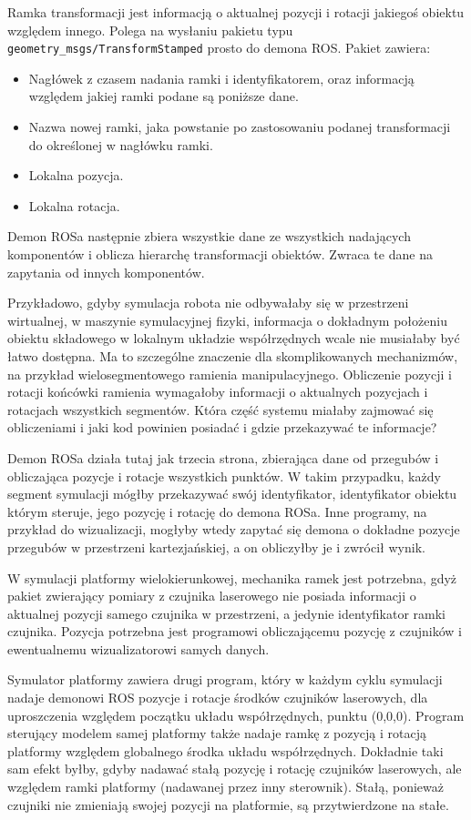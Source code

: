 		Ramka transformacji jest informacją o aktualnej pozycji i rotacji jakiegoś obiektu względem innego.
		Polega na wysłaniu pakietu typu \texttt{geometry\_msgs/TransformStamped} prosto do demona ROS.
		Pakiet zawiera:
		\begin{itemize}
			\item Nagłówek z czasem nadania ramki i identyfikatorem, oraz informacją względem jakiej ramki podane są poniższe dane.
			\item Nazwa nowej ramki, jaka powstanie po zastosowaniu podanej transformacji do określonej w nagłówku ramki.
			\item Lokalna pozycja.
			\item Lokalna rotacja.
		\end{itemize}
		Demon ROSa następnie zbiera wszystkie dane ze wszystkich nadających komponentów i oblicza hierarchę transformacji obiektów.
		Zwraca te dane na zapytania od innych komponentów.
		
		Przykładowo, gdyby symulacja robota nie odbywałaby się w przestrzeni wirtualnej, w maszynie symulacyjnej fizyki, 
		informacja o dokładnym położeniu obiektu składowego w lokalnym układzie współrzędnych wcale nie musiałaby być łatwo dostępna.
		Ma to szczególne znaczenie dla skomplikowanych mechanizmów, na przykład wielosegmentowego ramienia manipulacyjnego.
		Obliczenie pozycji i rotacji końcówki ramienia wymagałoby informacji o aktualnych pozycjach i rotacjach wszystkich segmentów.
		Która część systemu miałaby zajmować się obliczeniami i jaki kod powinien posiadać i gdzie przekazywać te informacje?
		
		Demon ROSa działa tutaj jak trzecia strona, zbierająca dane od przegubów i obliczająca pozycje i rotacje wszystkich punktów.
		W takim przypadku, każdy segment symulacji mógłby przekazywać swój identyfikator, identyfikator obiektu którym steruje, jego pozycję i rotację do demona ROSa.
		Inne programy, na przykład do wizualizacji, mogłyby wtedy zapytać się demona o dokładne pozycje przegubów w przestrzeni kartezjańskiej, a on obliczyłby je i zwrócił wynik.
		
		W symulacji platformy wielokierunkowej, mechanika ramek jest potrzebna, gdyż pakiet zwierający pomiary z czujnika laserowego nie posiada informacji o aktualnej
		pozycji samego czujnika w przestrzeni, a jedynie identyfikator ramki czujnika. 
		Pozycja potrzebna jest programowi obliczającemu pozycję z czujników i ewentualnemu wizualizatorowi samych danych.
		
		Symulator platformy zawiera drugi program, który w każdym cyklu symulacji nadaje demonowi ROS pozycje i rotacje środków czujników laserowych, dla uproszczenia
		względem początku układu współrzędnych, punktu (0,0,0). 
		Program sterujący modelem samej platformy także nadaje ramkę z pozycją i rotacją platformy względem globalnego środka układu współrzędnych.
		Dokładnie taki sam efekt byłby, gdyby nadawać stałą pozycję i rotację czujników laserowych, ale względem ramki platformy (nadawanej przez inny sterownik).
		Stałą, ponieważ czujniki nie zmieniają swojej pozycji na platformie, są przytwierdzone na stałe.
		
